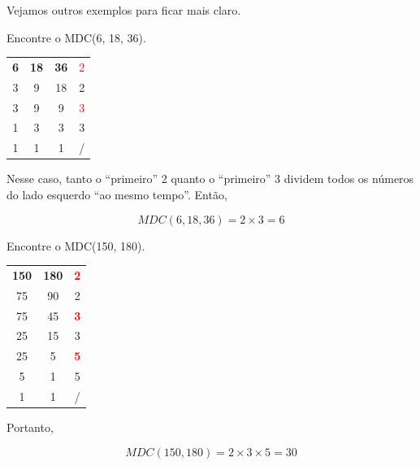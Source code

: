 Vejamos outros exemplos para ficar mais claro.

\begin{exemplo}
    Encontre o MDC(6, 18, 36).

    \begin{table}[H]
    \centering
    \begin{tabular}{ccc|c}
        \textbf{6} & \textbf{18} & \textbf{36} & \textcolor{red}{2}\\
        3 & 9 & 18 & 2\\
        3 & 9 & 9 & \textcolor{red}{3}\\
        1 & 3 & 3 & 3\\
        1 & 1 & 1 & /\\
    \end{tabular}
    \end{table}

    Nesse caso, tanto o ``primeiro'' 2 quanto o ``primeiro'' 3 dividem todos os números do lado esquerdo ``ao mesmo tempo''. Então,

    \begin{equation}
        MDC(6,18,36)=2\times3=6
    \end{equation}
\end{exemplo}

\begin{exemplo}
    Encontre o MDC(150, 180).

    \begin{table}[H]
    \centering
    \begin{tabular}{cc|c}
        \textbf{150} & \textbf{180} & \textbf{\textcolor{red}{2}}\\
        75 & 90 & 2\\
        75 & 45 & \textbf{\textcolor{red}{3}} \\
        25 & 15 & 3 \\
        25 & 5 & \textbf{\textcolor{red}{5}} \\
        5 & 1 & 5 \\
        1 & 1 & / \\
    \end{tabular}
    \end{table}

    Portanto,

    \begin{equation}
        MDC(150, 180)=2\times3\times5=30
    \end{equation}
\end{exemplo}

